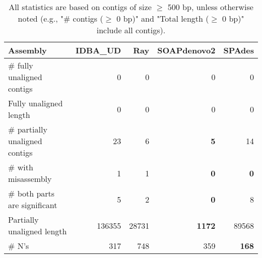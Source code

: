 \documentclass[12pt,a4paper]{article}
\begin{document}
\begin{table}[ht]
\begin{center}
\caption{All statistics are based on contigs of size $\geq$ 500 bp, unless otherwise noted (e.g., "\# contigs ($\geq$ 0 bp)" and "Total length ($\geq$ 0 bp)" include all contigs).}
\begin{tabular}{|l*{4}{|r}|}
\hline
Assembly & IDBA\_UD & Ray & SOAPdenovo2 & SPAdes \\ \hline
\# fully unaligned contigs & 0 & 0 & 0 & 0 \\ \hline
Fully unaligned length & 0 & 0 & 0 & 0 \\ \hline
\# partially unaligned contigs & 23 & 6 & {\bf 5} & 14 \\ \hline
\hspace{5mm}\# with misassembly & 1 & 1 & {\bf 0} & {\bf 0} \\ \hline
\hspace{5mm}\# both parts are significant & 5 & 2 & {\bf 0} & 8 \\ \hline
Partially unaligned length & 136355 & 28731 & {\bf 1172} & 89568 \\ \hline
\# N's & 317 & 748 & 359 & {\bf 168} \\ \hline
\end{tabular}
\end{center}
\end{table}
\end{document}
